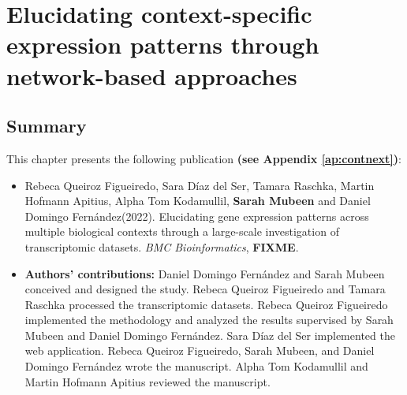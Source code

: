 \chapter{Elucidating context-specific expression patterns through network-based approaches}

\label{ch:contnext}

\section*{Summary}
 
This chapter presents the following publication \textbf{(see Appendix \ref{ap:contnext})}:

\begin{itemize}

\item[] Rebeca Queiroz Figueiredo, Sara Díaz del Ser, Tamara Raschka, Martin Hofmann Apitius, Alpha Tom Kodamullil, \textbf{Sarah Mubeen\footnotemark{}} and Daniel Domingo Fernández\footnotemark[\value{footnote}] (2022). Elucidating gene expression patterns across multiple biological contexts through a large-scale investigation of transcriptomic datasets. \textit{BMC Bioinformatics}, \textbf{FIXME}.

\item[] \textbf{Authors' contributions:} Daniel Domingo Fernández and Sarah Mubeen conceived and designed the study. Rebeca Queiroz Figueiredo and Tamara Raschka processed the transcriptomic datasets. Rebeca Queiroz Figueiredo implemented the methodology and analyzed the results supervised by Sarah Mubeen and Daniel Domingo Fernández. Sara Díaz del Ser implemented the web application. Rebeca Queiroz Figueiredo, Sarah Mubeen, and Daniel Domingo Fernández wrote the manuscript. Alpha Tom Kodamullil and Martin Hofmann Apitius reviewed the manuscript.

\end{itemize}


